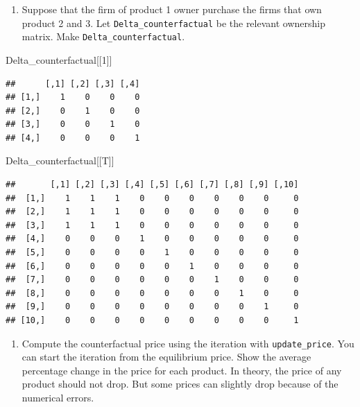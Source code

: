 \documentclass[
]{book}
\newenvironment{Shaded}{\begin{snugshade}}{\end{snugshade}}
\newcommand{\DecValTok}[1]{\textcolor[rgb]{0.00,0.00,0.81}{#1}}
\newcommand{\NormalTok}[1]{#1}
\providecommand{\tightlist}{%
  \setlength{\itemsep}{0pt}\setlength{\parskip}{0pt}}
\begin{document}
\begin{enumerate}
\def\labelenumi{\arabic{enumi}.}
\tightlist
\item
  Suppose that the firm of product 1 owner purchase the firms that own product 2 and 3. Let \texttt{Delta\_counterfactual} be the relevant ownership matrix. Make \texttt{Delta\_counterfactual}.
\end{enumerate}

\begin{Shaded}
\begin{Highlighting}[]
\NormalTok{Delta\_counterfactual[[}\DecValTok{1}\NormalTok{]]}
\end{Highlighting}
\end{Shaded}

\begin{verbatim}
##      [,1] [,2] [,3] [,4]
## [1,]    1    0    0    0
## [2,]    0    1    0    0
## [3,]    0    0    1    0
## [4,]    0    0    0    1
\end{verbatim}

\begin{Shaded}
\begin{Highlighting}[]
\NormalTok{Delta\_counterfactual[[T]]}
\end{Highlighting}
\end{Shaded}

\begin{verbatim}
##       [,1] [,2] [,3] [,4] [,5] [,6] [,7] [,8] [,9] [,10]
##  [1,]    1    1    1    0    0    0    0    0    0     0
##  [2,]    1    1    1    0    0    0    0    0    0     0
##  [3,]    1    1    1    0    0    0    0    0    0     0
##  [4,]    0    0    0    1    0    0    0    0    0     0
##  [5,]    0    0    0    0    1    0    0    0    0     0
##  [6,]    0    0    0    0    0    1    0    0    0     0
##  [7,]    0    0    0    0    0    0    1    0    0     0
##  [8,]    0    0    0    0    0    0    0    1    0     0
##  [9,]    0    0    0    0    0    0    0    0    1     0
## [10,]    0    0    0    0    0    0    0    0    0     1
\end{verbatim}

\begin{enumerate}
\def\labelenumi{\arabic{enumi}.}
\setcounter{enumi}{1}
\tightlist
\item
  Compute the counterfactual price using the iteration with \texttt{update\_price}. You can start the iteration from the equilibrium price. Show the average percentage change in the price for each product. In theory, the price of any product should not drop. But some prices can slightly drop because of the numerical errors.
\end{enumerate}
\end{document}
